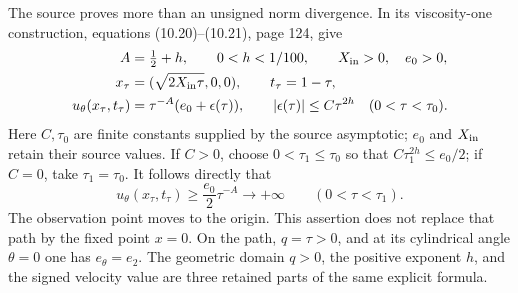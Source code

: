 The source proves more than an unsigned norm divergence. In its
viscosity-one construction, equations (10.20)--(10.21), page 124, give
\begin{equation}
 \begin{split}
 A&=\tfrac12+h,\qquad 0<h<1/100,\qquad X_{\rm in}>0,\quad e_0>0,\\
 x_\tau&=(\sqrt{2X_{\rm in}\tau},0,0),\qquad t_\tau=1-\tau,\\
 u_\theta(x_\tau,t_\tau)
   &=\tau^{-A}(e_0+\epsilon(\tau)),\qquad
      |\epsilon(\tau)|\le C\tau^{2h}\quad(0<\tau<\tau_0).
 \end{split}\label{nsprop:positive_path}
\end{equation}
Here $C,\tau_0$ are finite constants supplied by the source asymptotic;
$e_0$ and $X_{\rm in}$ retain their source values. If $C>0$, choose
$0<\tau_1\le\tau_0$ so that $C\tau_1^{2h}\le e_0/2$; if $C=0$,
take $\tau_1=\tau_0$. It follows directly that
\[
 u_\theta(x_\tau,t_\tau)\ge \frac{e_0}{2}\tau^{-A}
       \longrightarrow+\infty\qquad(0<\tau<\tau_1).
\]
The observation point moves to the origin. This assertion does not
replace that path by the fixed point $x=0$. On the path, $q=\tau>0$,
and at its cylindrical angle $\theta=0$ one has $e_\theta=e_2$.
The geometric domain $q>0$, the positive exponent $h$, and the signed
velocity value are three retained parts of the same explicit formula.

